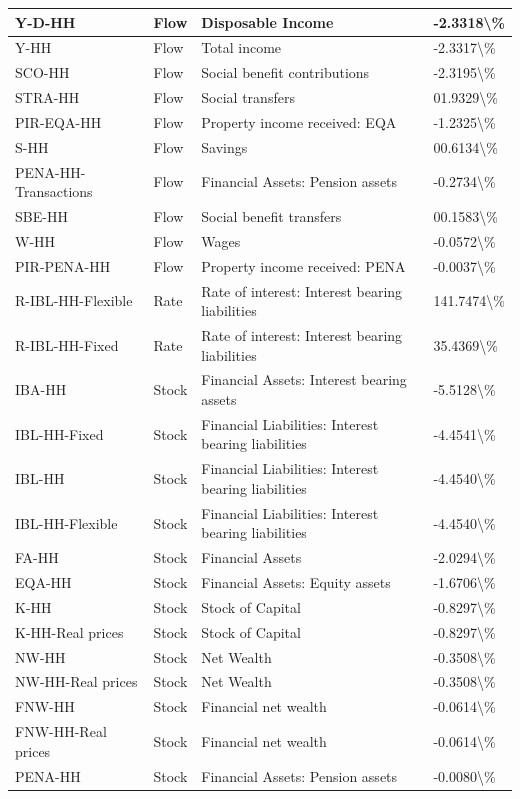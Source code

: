 \documentclass[
]{book}
\begin{document}
\begin{table}
\begin{tabular}[t]{l|l|l|l}
\hline
Y-D-HH & Flow & Disposable Income & -2.3318\textbackslash{}\%\\
\hline
Y-HH & Flow & Total income & -2.3317\textbackslash{}\%\\
\hline
SCO-HH & Flow & Social benefit contributions & -2.3195\textbackslash{}\%\\
\hline
STRA-HH & Flow & Social transfers & 01.9329\textbackslash{}\%\\
\hline
PIR-EQA-HH & Flow & Property income received: EQA & -1.2325\textbackslash{}\%\\
\hline
S-HH & Flow & Savings & 00.6134\textbackslash{}\%\\
\hline
PENA-HH-Transactions & Flow & Financial Assets: Pension assets & -0.2734\textbackslash{}\%\\
\hline
SBE-HH & Flow & Social benefit transfers & 00.1583\textbackslash{}\%\\
\hline
W-HH & Flow & Wages & -0.0572\textbackslash{}\%\\
\hline
PIR-PENA-HH & Flow & Property income received: PENA & -0.0037\textbackslash{}\%\\
\hline
R-IBL-HH-Flexible & Rate & Rate of interest: Interest bearing liabilities & 141.7474\textbackslash{}\%\\
\hline
R-IBL-HH-Fixed & Rate & Rate of interest: Interest bearing liabilities & 35.4369\textbackslash{}\%\\
\hline
IBA-HH & Stock & Financial Assets: Interest bearing assets & -5.5128\textbackslash{}\%\\
\hline
IBL-HH-Fixed & Stock & Financial Liabilities: Interest bearing liabilities & -4.4541\textbackslash{}\%\\
\hline
IBL-HH & Stock & Financial Liabilities: Interest bearing liabilities & -4.4540\textbackslash{}\%\\
\hline
IBL-HH-Flexible & Stock & Financial Liabilities: Interest bearing liabilities & -4.4540\textbackslash{}\%\\
\hline
FA-HH & Stock & Financial Assets & -2.0294\textbackslash{}\%\\
\hline
EQA-HH & Stock & Financial Assets: Equity assets & -1.6706\textbackslash{}\%\\
\hline
K-HH & Stock & Stock of Capital & -0.8297\textbackslash{}\%\\
\hline
K-HH-Real prices & Stock & Stock of Capital & -0.8297\textbackslash{}\%\\
\hline
NW-HH & Stock & Net Wealth & -0.3508\textbackslash{}\%\\
\hline
NW-HH-Real prices & Stock & Net Wealth & -0.3508\textbackslash{}\%\\
\hline
FNW-HH & Stock & Financial net wealth & -0.0614\textbackslash{}\%\\
\hline
FNW-HH-Real prices & Stock & Financial net wealth & -0.0614\textbackslash{}\%\\
\hline
PENA-HH & Stock & Financial Assets: Pension assets & -0.0080\textbackslash{}\%\\
\hline
\end{tabular}
\end{table}
\end{document}
